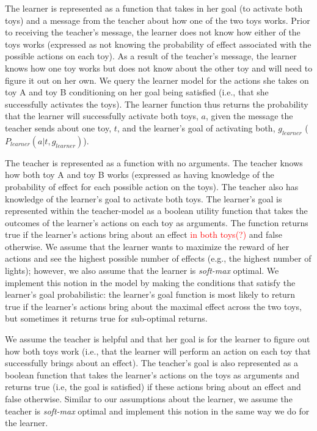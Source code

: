 \documentclass[10pt,letterpaper]{article}
\begin{document}
The learner is represented as a function that takes in her goal (to activate both toys) and a message from the teacher about how one of the two toys works. Prior to receiving the teacher's message, the learner does not know how either of the toys works (expressed as not knowing the probability of effect associated with the possible actions on each toy).  As a result of the teacher's message, the learner knows how one toy works but does not know about the other toy and will need to figure it out on her own. We query the learner model for the actions she takes on toy A and toy B conditioning on her goal being satisfied (i.e., that she successfully activates the toys). The learner function thus returns the probability that the learner will successfully activate both toys, $a$, given the message the teacher sends about one toy, $t$, and the learner's goal of activating both, $g_{learner}$ ($P_{learner}(a | t, g_{learner})$). 

The teacher is represented as a function with no arguments. The teacher knows how both toy A and toy B works (expressed as having knowledge of the probability of effect for each possible action on the toys). The teacher also has knowledge of the learner's goal to activate both toys. The learner's goal is represented within the teacher-model as a boolean utility function that takes the outcomes of the learner's actions on each toy as arguments. The function returns true if the learner's actions bring about an effect \textcolor{red}{in both toys(?)} and false otherwise. We assume that the learner wants to maximize the reward of her actions and see the highest possible number of effects (e.g., the highest number of lights); however, we also assume that the learner is \textit{soft-max} optimal. We implement this notion in the model by making the conditions that satisfy the learner's goal probabilistic: the learner's goal function is most likely to return true if the learner's actions bring about the maximal effect across the two toys, but sometimes it returns true for sub-optimal returns. 

We assume the teacher is helpful and that her goal is for the learner to figure out how both toys work (i.e., that the learner will perform an action on each toy that successfully brings about an effect). The teacher's goal is also represented as a boolean function that takes the learner's actions on the toys as arguments and returns true (i.e, the goal is satisfied) if these actions bring about an effect and false otherwise. Similar to our assumptions about the learner, we assume the teacher is \textit{soft-max} optimal and implement this notion in the same way we do for the learner. 
\end{document}
